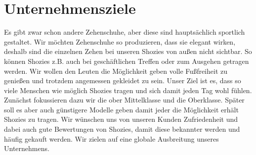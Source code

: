 \chapter{Unternehmensziele}
\label{cha:2}
Es gibt zwar schon andere Zehenschuhe, aber diese sind hauptsächlich sportlich gestaltet. Wir möchten Zehenschuhe so produzieren, dass sie elegant wirken, deshalb sind die einzelnen Zehen bei unseren Shozies von außen nicht sichtbar. So können Shozies z.B. auch bei geschäftlichen Treffen oder zum Ausgehen getragen werden. 
Wir wollen den Leuten die Möglichkeit geben volle Fußfreiheit zu genießen und trotzdem angemessen gekleidet zu sein.
Unser Ziel ist es, dass so viele Menschen wie möglich Shozies tragen und sich damit jeden Tag wohl fühlen. Zunächst fokussieren dazu wir die ober Mittelklasse und die Oberklasse. Später soll es aber auch günstigere Modelle geben damit jeder die Möglichkeit erhält Shozies zu tragen.
Wir wünschen uns von unseren Kunden Zufriedenheit und dabei auch gute Bewertungen von Shozies, damit diese bekannter werden und häufig gekauft werden.
Wir zielen auf eine globale Ausbreitung unseres Unternehmens.